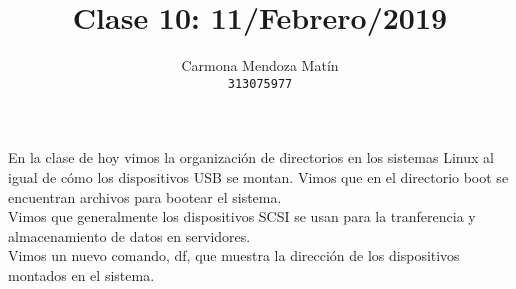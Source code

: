 \documentclass[11pt, a4paper]{report}
\begin{document}
\title{Clase 10: 11/Febrero/2019}
\author{
  Carmona Mendoza Mat\'in\\
  \texttt{313075977}
}
\date{}
\maketitle

En la clase de hoy vimos la organizaci\'on de directorios en los sistemas Linux
al igual de c\'omo los dispositivos USB se montan. Vimos que en el directorio
boot se encuentran archivos para bootear el sistema. \\

Vimos que generalmente los dispositivos SCSI se usan para la tranferencia y
almacenamiento de datos en servidores. \\

Vimos un nuevo comando, df, que muestra la direcci\'on de los dispositivos
montados en el sistema.
\end{document}

